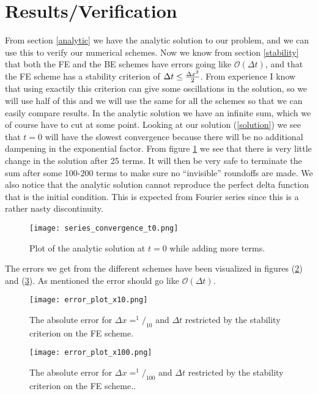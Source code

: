 \documentclass[a4paper,english, 10pt, twoside]{article}
\begin{document}
\section{Results/Verification}\label{results}
From section \ref{analytic} we have the analytic solution to our problem, and we can use this to verify our numerical schemes. Now we know from 
section \ref{stability} that both the FE and the BE schemes have errors going like $\mathcal{O}(\Delta t)$, and that the FE scheme has a stability 
criterion of $\Delta t\leq {\Delta x^2 \over 2}$. From experience I know that using exactily this criterion can give some oscillations in the solution, 
so we will use half of this 
and we will use the same for all the schemes so that we can easily compare results. In the analytic solution we have an infinite sum, which we of 
course have to cut at some point. Looking at our solution (\ref{solution}) we see that $t=0$ will have the slowest convergence because there will be 
no additional dampening in the exponential factor. From figure \ref{convergence_analytic} we see that there is very little change in the solution 
after 25 terms. It will then be very safe to terminate the sum after some 100-200 terms to make sure no ``invisible'' roundoffs are made. We also 
notice that the analytic solution cannot reproduce the perfect delta function that is the initial condition. This is expected from Fourier series 
since this is a rather nasty discontinuity.
\begin{figure}[H]
 \centering
 \texttt{[image: series\_convergence\_t0.png]}
 \caption{Plot of the analytic solution at $t=0$ while adding more terms. }
 \label{convergence_analytic}
\end{figure}
The errors we get from the different schemes have been visualized in figures (\ref{errors_nx10}) and (\ref{errors_nx100}). As mentioned the error 
should go like $\mathcal{O}(\Delta t)$. 
\begin{figure}[H]
 \centering
 \texttt{[image: error\_plot\_x10.png]}
 \caption{The absolute error for $\Delta x = ^1/_{10}$ and $\Delta t$ restricted by the stability criterion on the FE scheme. }
 \label{errors_nx10}
\end{figure}
\begin{figure}[H]
 \centering
 \texttt{[image: error\_plot\_x100.png]}
 \caption{The absolute error for $\Delta x = ^1/_{100}$ and $\Delta t$ restricted by the stability criterion on the FE scheme.. }
 \label{errors_nx100}
\end{figure}
\end{document}
